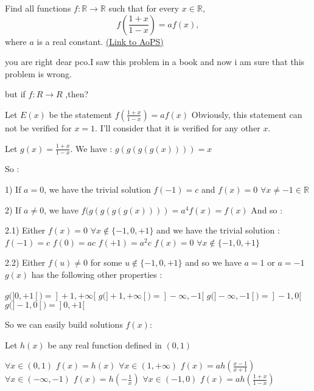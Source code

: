 \begin{problem}
	Find all functions $ f : \mathbb R \longrightarrow \mathbb R$ such that for every $ x\in \mathbb R$,
\[ f\left(\frac{1+x}{1-x}\right) = af(x),\]
where $a$ is a real constant.
	\flushright \href{https://artofproblemsolving.com/community/c6h272552}{(Link to AoPS)}
\end{problem}



\begin{solution}
	\begin{tcolorbox}you are right dear pco.I saw this problem in a book and now i am sure that this problem is wrong.

but if $ f : R \longrightarrow R$ ,then?\end{tcolorbox}
Let $ E(x)$ be the statement $ f(\frac {1 + x}{1 - x}) = af(x)$
Obviously, this statement can not be verified for $ x = 1$. I'll consider that it is verified for any other $ x$.

Let $ g(x) = \frac {1 + x}{1 - x}$. We have : $ g(g(g(g(x)))) = x$

So :

1) If $ a = 0$, we have the trivial solution $ f( - 1) = c$ and $ f(x) = 0$ $ \forall x\neq - 1\in\mathbb{R}$

2) If $ a\neq 0$, we have $ f(g(g(g(g(x)))) = a^4f(x) = f(x)$ And so :

2.1) Either $ f(x) = 0$ $ \forall x\notin\{ - 1,0, + 1\}$ and we have the trivial solution :
$ f( - 1) = c$
$ f(0) = ac$
$ f( + 1) = a^2c$
$ f(x) = 0$ $ \forall x\notin\{ - 1,0, + 1\}$

2.2) Either $ f(u)\neq 0$ for some $ u\notin\{ - 1,0, + 1\}$ and so we have $ a = 1$ or $ a = - 1$
$ g(x)$ has the following other properties :

$ g(]0, + 1[) = ] + 1, + \infty[$
$ g(] + 1, + \infty[) = ] - \infty, - 1[$
$ g(] - \infty, - 1[) = ] - 1,0[$
$ g(] - 1,0[) = ]0, + 1[$

So we can easily build solutions $ f(x)$:

Let $ h(x)$ be any real function defined in $ (0,1)$

$ \forall x\in(0,1)$ $ f(x) = h(x)$
$ \forall x\in(1, + \infty)$ $ f(x) = ah(\frac {x - 1}{x + 1})$
$ \forall x\in( - \infty, - 1)$ $ f(x) = h( - \frac {1}{x})$
$ \forall x\in( - 1,0)$ $ f(x) = ah(\frac {1 + x}{1 - x})$


\end{solution}
